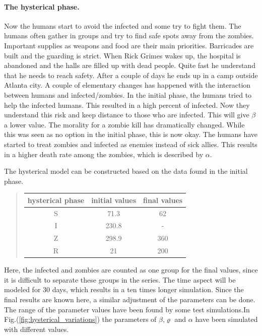 \documentclass[%
twoside,                 %
final,                   %
10pt]{article}
\begin{document}
\paragraph{The hysterical phase.}
Now the humans start to avoid the infected and some try to fight them. The humans often gather in groups and try to find safe spots away from the zombies. Important supplies as weapons and food are their main priorities. Barricades are built and the guarding is strict. When Rick Grimes wakes up, the hospital is abandoned and the halls are filled up with dead people. Quite fast he understand that he needs to reach safety. After a couple of days he ends up in a camp outside Atlanta city. A couple of elementary changes has happened with the interaction between humans and infected/zombies. In the initial phase, the humans tried to help the infected humans. This resulted in a high percent of infected. Now they understand this risk and keep distance to those who are infected. This will give $\beta$ a lower value. The morality for a zombie kill has dramatically changed. While this was seen as no option in the initial phase, this is now okay. The humans have started to treat zombies and infected as enemies instead of sick allies. This results in a higher death rate among the zombies, which is described by $\alpha$. 


\vspace{3mm}




\vspace{3mm}


The hysterical model can be constructed based on the data found in the initial phase. 


\begin{quote}
\begin{tabular}{ccc}
\hline
\multicolumn{1}{c}{ hysterical phase } & \multicolumn{1}{c}{ initial values } & \multicolumn{1}{c}{ final values } \\
\hline
S                & 71.3           & 62           \\
I                & 230.8          & -            \\
Z                & 298.9          & 360          \\
R                & 21             & 200          \\
\hline
\end{tabular}
\end{quote}

\noindent
Here, the infected and zombies are counted as one group for the final values, since it is difficult to separate these groups in the series. The time aspect will be modeled for 30 days, which results in a ten times longer simulation. Since the final results are known here, a similar adjustment of the parameters can be done. The range of the parameter values have been found by some test simulations.In Fig.(\ref{fig:hysterical_variations}) the parameters of $\beta$,$\varrho$ and $\alpha$ have been simulated with different values. 
\end{document}
